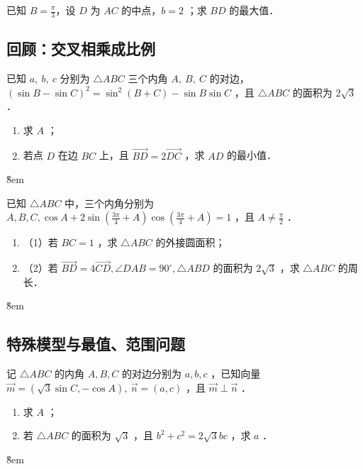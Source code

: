 \begin{example}
    已知 $B = \frac{\pi}{3}$，设 $D$ 为 $A C$ 的中点，$b=2$ ；求 $B D$ 的最大值．
\end{example}

\subsection{回顾：交叉相乘成比例}

\begin{theorem}

\end{theorem}

\begin{example}
    已知 $a, ~ b, ~ c$ 分别为 $\triangle A B C$ 三个内角 $A, ~ B, ~ C$ 的对边，$(\sin B-\sin C)^2=\sin ^2(B+C)-\sin B \sin C$ ，且 $\triangle A B C$ 的面积为 $2 \sqrt{3}$ ．
    \begin{enumerate}
        \item 求 $A$ ；
        \item 若点 $D$ 在边 $BC$ 上，且 $\overrightarrow{BD}=2 \overrightarrow{DC}$ ，求 $A D$ 的最小值．
    \end{enumerate}
\end{example}
\v{8em}

\begin{example}
    已知 $\triangle A B C$ 中，三个内角分别为 $A, B, C, \cos A+2 \sin \left(\frac{3 \pi}{4}+A\right) \cos \left(\frac{3 \pi}{4}+A\right)=1$ ，且 $A \neq \frac{\pi}{2}$ ．
    \begin{enumerate}
        \item （1）若 $B C=1$ ，求 $\triangle A B C$ 的外接圆面积；
        \item （2）若 $\overrightarrow{B D}=4 \overrightarrow{C D}, \angle D A B=90^{\circ}, \triangle A B D$ 的面积为 $2 \sqrt{3}$ ，求 $\triangle A B C$ 的周长．
    \end{enumerate}
\end{example}
\v{8em}

\subsection{特殊模型与最值、范围问题}

\begin{example}
    记 $\triangle A B C$ 的内角 $A, B, C$ 的对边分别为 $a, b, c$ ，已知向量 $\overrightarrow{m}=(\sqrt{3} \sin C,-\cos A), ~ \overrightarrow{n}=(a, c)$ ，且 $\overrightarrow{m} \perp \overrightarrow{n}$ ．
    \begin{enumerate}
        \item 求 $A$ ；
        \item 若 $\triangle A B C$ 的面积为 $\sqrt{3}$ ，且 $b^2+c^2=2 \sqrt{3} b c$ ，求 $a$ ．
    \end{enumerate}
\end{example}
\v{8em}

